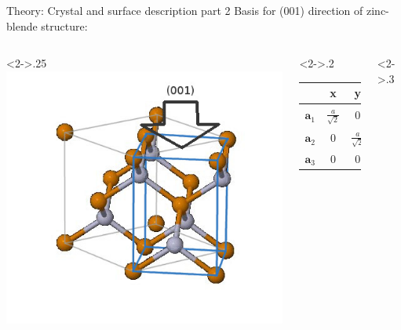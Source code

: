 \begin{frame}{Theory: Crystal and surface description part 2}
	Basis for (001) direction of zinc-blende structure: 
	\begin{columns}
		\hspace{-1cm}
		\begin{column}<2->{.25\linewidth}
			\includegraphics[width=1.2\linewidth]{andere_bilder/zinc_blende_45degree.jpg}
		\end{column}
		\hspace{-1cm}
		\begin{column}<2->{.2\linewidth}\scriptsize{
			\begin{tabular}{c c c c} 
				\hline
				& \textbf{x} & \textbf{y} & \textbf{z}\\ 
				\hline 
				\vspace{0.2cm} 
				$\boldsymbol{a}_1$ & $\frac{a}{\sqrt{2}}$  & $0$ & $0$ \\
				\vspace{0.2cm}
				$\boldsymbol{a}_2$ & $0$ & $\frac{a}{\sqrt{2}}$ & $0$ \\
				\vspace{0.2cm}
				$\boldsymbol{a}_3$ & $0$ & $0$ & $a$ 
			\end{tabular}
		}	
		\end{column}
		\begin{column}<2->{.3\linewidth}\scriptsize{
			\begin{tabular}{c c c c} 

\end{tabular}}
\end{column}
\end{columns}
\end{frame}
